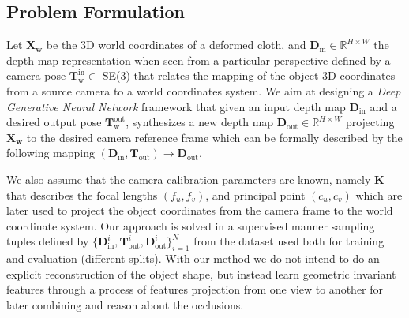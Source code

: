 
\subsection{Problem Formulation}
Let $\mathbf{X_w}$ be the 3D world coordinates of a deformed cloth, and $\mathbf{D}_{\textrm{in}} \in \mathbb{R}^{H \times W}$ the depth map representation when seen from a particular perspective defined by a camera pose $\mathbf{T}_{\textrm{w}}^{\textrm{in}}\in$ SE(3) that relates the mapping of the object 3D coordinates from a source camera to a world coordinates system. We aim at designing a \textit{Deep Generative Neural Network} framework that given an input depth map $\mathbf{D}_{\textrm{in}}$ and a desired output pose $\mathbf{T}_{\textrm{w}}^{\textrm{out}}$, synthesizes a new depth map $\mathbf{D}_{\textrm{out}}\in \mathbb{R}^{H \times W}$ projecting $\mathbf{X_w}$ to the desired camera reference frame which can be formally described by the following mapping $(\mathbf{D}_{\textrm{in}}, \mathbf{T}_{\textrm{out}})\rightarrow \mathbf{D}_{\textrm{out}}$.

We also assume that the camera calibration parameters are known, namely $\mathbf{K}$ that describes the focal lengths $(f_u, f_v)$, and principal point $(c_u, c_v)$ which are later  used to project the object coordinates from the camera frame to the world coordinate system. Our approach is solved in a supervised manner sampling tuples defined by $\{\mathbf{D}_{\textrm{in}}^i, \mathbf{T}_{\textrm{out}}^i, \mathbf{D}_{\textrm{out}}^i\}_{i=1}^N$ from the dataset used both for training and evaluation (different splits). With our method we do not intend to do an explicit reconstruction of the object shape, but instead learn geometric invariant features through a process of features projection from one view to another for later combining and reason about the occlusions.

